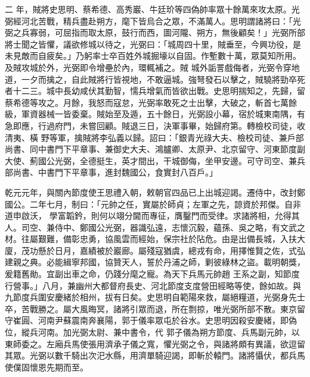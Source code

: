 \begin{pinyinscope}
 二
 年，賊將史思明、蔡希德、高秀巖、牛廷玠等四偽帥率眾十餘萬來攻太原。光弼經河北苦戰，精兵盡赴朔方，麾下皆烏合之眾，不滿萬人。思明謂諸將曰：「光弼之兵寡弱，可屈指而取太原，鼓行而西，圖河隴、朔方，無後顧矣！」光弼所部將士聞之皆懼，議欲修城以待之，光弼曰：「城周四十里，賊垂至，今興功役，是未見敵而自疲矣。」乃躬率士卒百姓外城掘壕以自固。作塹數十萬，眾莫知所用。及賊攻城於外，光弼即令增壘於內，環輒補之。賊
 城外詬詈戲侮者，光弼令穿地道，一夕而擒之，自此賊將行皆視地，不敢逼城。強弩發石以擊之，賊驍將勁卒死者十二三。城中長幼咸伏其勤智，懦兵增氣而皆欲出戰。史思明揣知之，先歸，留蔡希德等攻之。月餘，我怒而寇怠，光弼率敢死之士出擊，大破之，斬首七萬餘級，軍資器械一皆委棄。賊始至及遁，五十餘日，光弼設小幕，宿於城東南隅，有急即應，行過府門，未嘗回顧。賊退三日，決軍事畢，始歸府第。轉檢校司徒，收清夷、橫
 野等軍，擒賊將李弘義以歸。詔曰：「銀青光祿大夫、檢校司徒、兼戶部尚書、同中書門下平章事、兼御史大夫、鴻臚卿、太原尹、北京留守、河東節度副大使、薊國公光弼，全德挺生，英才間出，干城御侮，坐甲安邊。可守司空、兼兵部尚書、中書門下平章事，進封魏國公，食實封八百戶。」



 乾元元年，與關內節度使王思禮入朝，敕朝官四品已上出城迎謁。遷侍中，改封鄭國公。二年七月，制曰：「元帥之任，實屬於師貞；左軍之先，諒資於邦傑。自非道申啟沃，
 學富韜鈐，則何以翊分閫而專征，膺鑿門而受律。求諸將相，允得其人。司空、兼侍中、鄭國公光弼，器識弘遠，志懷沉毅，蘊孫、吳之略，有文武之材。往屬艱難，備彰忠勇，協風雲而經始，保宗社於阽危。由是出備長城，入扶大廈，茂功懸於日月，嘉績被於巖廊。屬殘寇猶虞，總戎有命，用擇惟賢之佐，式弘建親之典。必能緝寧邦國，協贊天人，誓於丹浦之師，剿彼綠林之盜。載明朝獎，爰籍舊勛。宜副出車之命，仍踐分麾之寵。為天下兵馬元帥趙
 王系之副，知節度行營事。」八月，兼幽州大都督府長史、河北節度支度營田經略等使，餘如故。與九節度兵圍安慶緒於相州，拔有日矣。史思明自範陽來救，屬絕糧道，光弼身先士卒，苦戰勝之。屬大風晦冥，諸將引眾而退，所在剽掠，唯光弼所部不散。東京留守崔圓、河南尹蘇震南奔襄陽，郭于儀率眾屯於谷水。史思明因殺安慶緒，即偽位，縱兵河南。加光弼太尉、兼中書令，代
 郭子儀為朔方節度、兵馬副元帥，以東師委之。左廂兵馬使張用濟承子儀之寬，懼光弼之令，與諸將頗有異議，欲逗留其眾。光弼以數千騎出次汜水縣，用濟單騎迎謁，即斬於轅門。諸將懾伏，都兵馬使僕固懷恩先期而至。




\end{pinyinscope}
